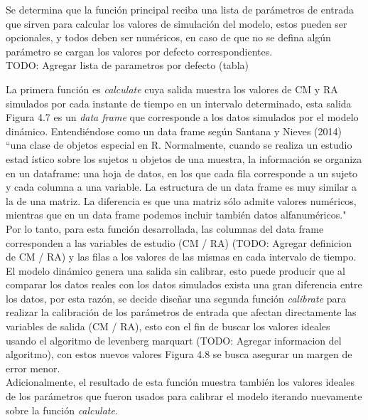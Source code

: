 Se determina que la funci\'on principal reciba una lista de par\'ametros de entrada que sirven para calcular los valores de simulaci\'on del modelo, estos pueden ser opcionales, y todos deben ser num\'ericos, en caso de que no se defina alg\'un par\'ametro se cargan los valores por defecto correspondientes.\\

TODO: Agregar lista de parametros por defecto (tabla)

La primera función es \textit{calculate} cuya salida muestra los valores de CM y RA simulados por cada instante de tiempo en un intervalo determinado, esta salida Figura 4.7 es un \textit{data frame} que corresponde a los datos simulados por el modelo din\'amico. Entendi\'endose como un data frame seg\'un Santana y Nieves (2014) “una clase de objetos especial en R. Normalmente, cuando se realiza un estudio estad \'istico sobre los sujetos u objetos de una muestra, la informaci\'on se organiza en un dataframe: una hoja de datos, en los que cada fila corresponde a un sujeto y cada columna a una variable. La estructura de un data frame es muy similar a la de una matriz. La diferencia es que una matriz s\'olo admite valores num\'ericos, mientras que en un data frame podemos incluir tambi\'en datos alfanum\'ericos."\\

Por lo tanto, para esta funci\'on desarrollada, las columnas del data frame corresponden a las variables de estudio (CM / RA) (TODO: Agregar definicion de CM / RA) y las filas a los valores de las mismas en cada intervalo de tiempo.\\

El modelo din\'amico genera una salida sin calibrar, esto puede producir que al comparar los datos reales con los datos simulados exista una gran diferencia entre los datos, por esta raz\'on, se decide diseñar una segunda función \textit{calibrate} para realizar la calibración de los par\'ametros de entrada que afectan directamente las variables de salida (CM / RA), esto con el fin de buscar los valores ideales usando el algoritmo de levenberg marquart (TODO: Agregar informacion del algoritmo), con estos nuevos valores Figura 4.8 se busca asegurar un margen de error menor.\\

Adicionalmente, el resultado de esta funci\'on muestra tambi\'en los valores ideales de los par\'ametros que fueron usados para calibrar el modelo iterando nuevamente sobre la función \textit{calculate}.\\


